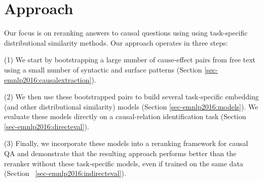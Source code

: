 
%
\section{Approach}
\label{sec-emnlp2016:approach}

Our focus is on reranking answers to causal questions using using task-specific distributional similarity methods.
%
Our approach operates in three steps:

{\flushleft (1)} We start by bootstrapping a large number of cause-effect pairs from free text using a small number of syntactic and surface patterns (Section \ref{sec-emnlp2016:causalextraction}).

{\flushleft (2)} We then use these bootstrapped pairs to build several task-specific embedding (and other distributional similarity) models (Section \ref{sec-emnlp2016:models}). We evaluate these models directly on a causal-relation identification task (Section \ref{sec-emnlp2016:directeval}).  

{\flushleft (3)} Finally, we incorporate these models into a reranking framework for causal QA and demonstrate that the resulting approach performs better than the reranker without these task-specific models, even if trained on the same data (Section ~\ref{sec-emnlp2016:indirecteval}).  



